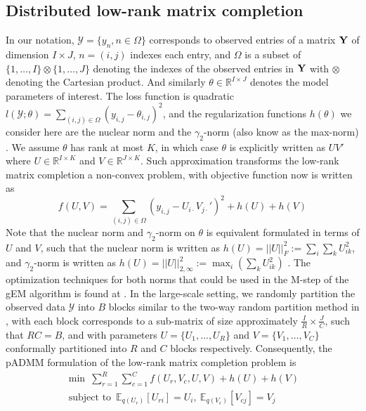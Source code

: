 \documentclass{article}
\DeclareMathOperator*{\st}{subject~to}
\newcommand{\Ymat}[0]{\ensuremath{{\bf Y}}\xspace}
\newcommand{\1}[0]{\ensuremath{\boldsymbol{1}}\xspace}
\begin{document}
\subsection{Distributed low-rank matrix completion}
In our notation, $\mathcal{Y} = \{y_n, n\in\Omega\}$ corresponds to observed entries of a matrix $\Ymat$ of dimension $I \times J$, $n = (i,j)$ indexes each entry, and $\Omega$ is a subset of $\{1, \ldots, I\}\otimes\{1,\ldots, J\}$ denoting the indexes of the observed entries in $\Ymat$ with $\otimes$ denoting the Cartesian product. And similarly $\theta \in \mathbb{R}^{I\times J}$ denotes the model parameters of interest. The loss function is quadratic $l(\mathcal{Y}; \theta) = \sum_{(i,j)\in\Omega}(y_{i,j} - \theta_{i,j})^2$, and the regularization functions $h(\theta)$ we consider here are the nuclear norm and the $\gamma_2$-norm (also know as the max-norm) \cite{Srebro2004}. We assume $\theta$ has rank at most $K$, in which case $\theta$ is explicitly written as $UV'$ where $U \in \mathbb{R}^{I\times K}$ and $V \in \mathbb{R}^{J \times K}$. Such approximation transforms the low-rank matrix completion a non-convex problem, with objective function now is written as
\begin{equation}\label{mf_obj}
\textstyle f(U,V) = \sum_{(i,j)\in\Omega}(y_{i,j} - U_{i\cdot}V_{j\cdot}')^2 + h(U) + h(V)
\end{equation}
Note that the nuclear norm and $\gamma_2$-norm on $\theta$ is equivalent formulated in terms of $U$ and $V$, such that the nuclear norm is written as $h(U) = ||U||_F^2 := \sum_{i}\sum_kU_{ik}^2$, and $\gamma_2$-norm is written as $h(U) = ||U||_{2,\infty}^2 := \max_i(\sum_k U_{ik}^2)$ \cite{Recht2010}. The optimization techniques for both norms that could be used in the M-step of the gEM algorithm is found at \cite{Salakhutdinov2007, Lee2010}. In the large-scale setting, we randomly partition the observed data $\mathcal{Y}$ into $B$ blocks similar to the two-way random partition method in \cite{Recht2011}, with each block corresponds to a sub-matrix of size approximately $\frac{I}{R} \times \frac{J}{C}$, such that $RC = B$, and with parameters $U = \{U_1, \ldots, U_R\}$ and $V = \{V_1, \ldots, V_C\}$ conformally partitioned into $R$ and $C$ blocks respectively. Consequently, the pADMM formulation of the low-rank matrix completion problem is
\begin{equation}\label{mf_padmm}
\begin{gathered}
\textstyle \min ~ \sum_{r=1}^R\sum_{c=1}^C f(U_r,V_c, U, V) + h(U) + h(V)\\
\st ~ \mathbb{E}_{q(U_r)}[U_{ri}] = U_i, ~ \mathbb{E}_{q(V_c)}[V_{cj}] = V_j
\end{gathered}
\end{equation}
\end{document}

